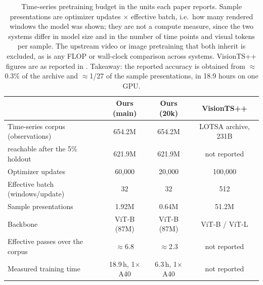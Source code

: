 \begin{table}[t]
\caption{Time-series pretraining budget in the units each paper reports. Sample presentations are
optimizer updates $\times$ effective batch, i.e.\ how many rendered windows the model was shown;
they are not a compute measure, since the two systems differ in model size and in the number of time
points and visual tokens per sample. The upstream video or image pretraining that both inherit is
excluded, as is any FLOP or wall-clock comparison across systems. VisionTS++ figures are as reported
in \citet{visiontspp}. Takeaway: the reported accuracy is obtained from $\approx$0.3\% of the
archive and $\approx$1/27 of the sample presentations, in 18.9 hours on one GPU.}
\label{tab:budget}
\begin{center}
\setlength{\tabcolsep}{5pt}
\footnotesize
\begin{tabular}{lccc}
\toprule
 & Ours (main) & Ours (20k) & VisionTS++ \\
\midrule
Time-series corpus (observations) & 654.2M & 654.2M & LOTSA archive, 231B \\
\quad reachable after the 5\% holdout & 621.9M & 621.9M & not reported \\
Optimizer updates & 60{,}000 & 20{,}000 & 100{,}000 \\
Effective batch (windows/update) & 32 & 32 & 512 \\
Sample presentations & 1.92M & 0.64M & 51.2M \\
Backbone & ViT-B (87M) & ViT-B (87M) & ViT-B / ViT-L \\
Effective passes over the corpus & $\approx$6.8 & $\approx$2.3 & not reported \\
Measured training time & 18.9\,h, 1$\times$A40 & 6.3\,h, 1$\times$A40 & not reported \\
\bottomrule
\end{tabular}
\end{center}
\end{table}
